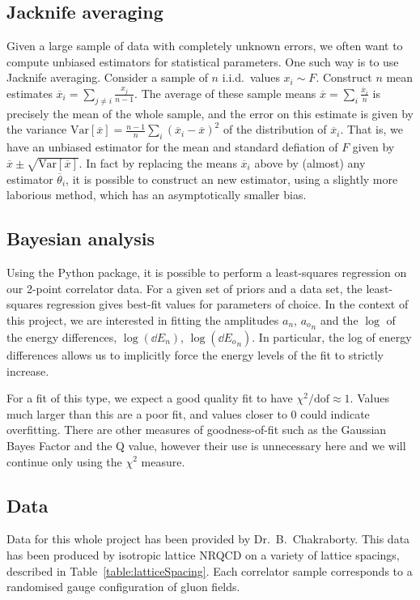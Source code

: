 \documentclass[a4paper,12pt]{article}
\begin{document}
\subsection{Jacknife averaging}
Given a large sample of data with completely unknown errors, we often want to compute unbiased estimators for statistical parameters. One such way is to use Jacknife averaging\cite{efron1982jackknife}. Consider a sample of $n$ i.i.d.\ values $x_i \sim F$. Construct $n$ mean estimates $\overline{x}_i = \sum_{j\neq i} \frac{x_j}{n-1}$. The average of these sample means $\overline{x} = \sum_i\frac{\overline{x}_i}{n}$ is precisely the mean of the whole sample, and the error on this estimate is given by the variance $\text{Var}[\overline{x}] = \frac{n-1}{n}\sum_i{(\overline{x}_i - \overline{x})}^2$ of the distribution of $\overline{x}_i$. That is, we have an unbiased estimator for the mean and standard defiation of $F$ given by $\overline{x} \pm \sqrt{\text{Var}[\overline{x}]}$. In fact by replacing the means $\overline{x}_i$ above by (almost) any estimator $\overline{\theta}_i$, it is possible to construct an new estimator, using a slightly more laborious method, which has an asymptotically smaller bias\cite{mcintosh2016jackknife}.

\subsection{Bayesian analysis}
Using the \cite{lepage2020corrfitter} Python package, it is possible to perform a least-squares regression on our 2-point correlator data. For a given set of priors and a data set, the least-squares regression gives best-fit values for parameters of choice. In the context of this project, we are interested in fitting the amplitudes $a_n$, ${a_o}_n$ and the $\log$ of the energy differences, $\log(\dd E_n)$, $\log({\dd E_o}_n)$. In particular, the log of energy differences allows us to implicitly force the energy levels of the fit to strictly increase.

For a fit of this type, we expect a good quality fit to have $\chi^2/\mathrm{dof} \approx 1$. Values much larger than this are a poor fit, and values closer to $0$ could indicate overfitting. There are other measures of goodness-of-fit such as the Gaussian Bayes Factor and the Q value, however their use is unnecessary here and we will continue only using the $\chi^2$ measure.

\subsection{Data}
Data for this whole project has been provided by Dr.\ B.\ Chakraborty. This data has been produced by isotropic lattice NRQCD on a variety of lattice spacings, described in Table~\ref{table:latticeSpacing}. Each correlator sample corresponds to a randomised gauge configuration of gluon fields.
\end{document}

